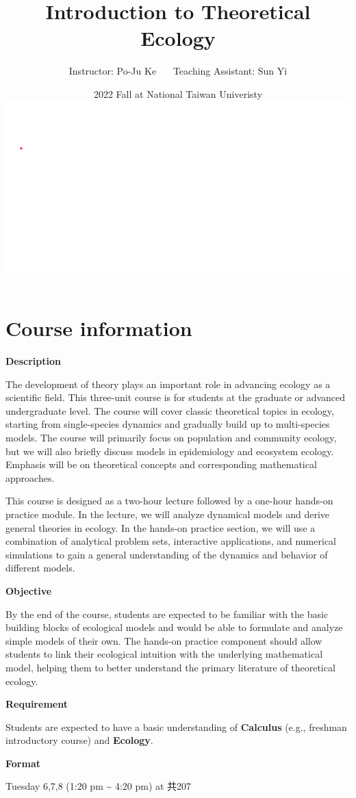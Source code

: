 \documentclass[
]{book}
\title{Introduction to Theoretical Ecology}
\author{Instructor: Po-Ju Ke \(~~~~~\) Teaching Assistant: Sun Yi}
\date{2022 Fall at National Taiwan Univeristy \includegraphics{./bifurcation.gif}}
\begin{document}
\maketitle

{
\setcounter{tocdepth}{1}
\tableofcontents
}
\hypertarget{course-information}{%
\chapter*{Course information}\label{course-information}}

\textbf{Description}

The development of theory plays an important role in advancing ecology as a scientific field. This three-unit course is for students at the graduate or advanced undergraduate level. The course will cover classic theoretical topics in ecology, starting from single-species dynamics and gradually build up to multi-species models. The course will primarily focus on population and community ecology, but we will also briefly discuss models in epidemiology and ecosystem ecology. Emphasis will be on theoretical concepts and corresponding mathematical approaches.

This course is designed as a two-hour lecture followed by a one-hour hands-on practice module. In the lecture, we will analyze dynamical models and derive general theories in ecology. In the hands-on practice section, we will use a combination of analytical problem sets, interactive applications, and numerical simulations to gain a general understanding of the dynamics and behavior of different models.

\textbf{Objective}

By the end of the course, students are expected to be familiar with the basic building blocks of ecological models and would be able to formulate and analyze simple models of their own. The hands-on practice component should allow students to link their ecological intuition with the underlying mathematical model, helping them to better understand the primary literature of theoretical ecology.

\textbf{Requirement}

Students are expected to have a basic understanding of \textbf{Calculus} (e.g., freshman introductory course) and \textbf{Ecology}.

\textbf{Format}

Tuesday 6,7,8 (1:20 pm \textasciitilde{} 4:20 pm) at 共207
\end{document}
